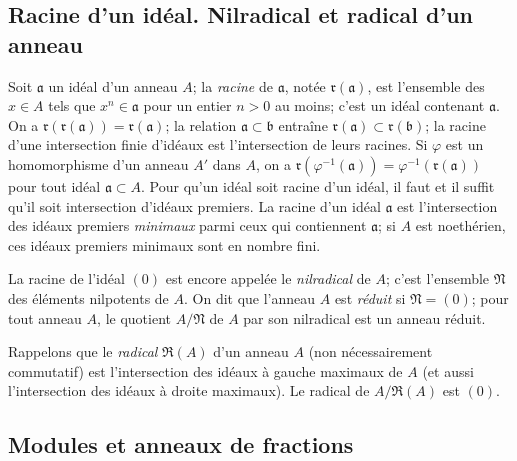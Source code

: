 \subsection{Racine d'un idéal. Nilradical et radical d'un anneau}
\label{subsection:0.1.1-fr}

\begin{env}[1.1.1]
\label{0.1.1.1-fr}
Soit $\mathfrak{a}$ un idéal d'un anneau $A$; la \emph{racine} de $\mathfrak{a}$, notée $\mathfrak{r}(\mathfrak{a})$, est l'ensemble des $x\in A$ tels que $x^n\in\mathfrak{a}$ pour un entier $n>0$ au moins; c'est un idéal contenant $\mathfrak{a}$.
On a $\mathfrak{r}(\mathfrak{r}(\mathfrak{a}))=\mathfrak{r}(\mathfrak{a})$; la relation $\mathfrak{a}\subset\mathfrak{b}$ entraîne $\mathfrak{r}(\mathfrak{a})\subset\mathfrak{r}(\mathfrak{b})$; la racine d'une intersection finie d'idéaux est l'intersection de leurs racines.
Si $\varphi$ est un homomorphisme d'un anneau $A'$ dans $A$, on a $\mathfrak{r}(\varphi^{-1}(\mathfrak{a}))=\varphi^{-1}(\mathfrak{r}(\mathfrak{a}))$ pour tout idéal $\mathfrak{a}\subset A$.
Pour qu'un idéal soit racine d'un idéal, il faut et il suffit qu'il soit intersection d'idéaux premiers.
La racine d'un idéal $\mathfrak{a}$ est l'intersection des idéaux premiers \emph{minimaux} parmi ceux qui contiennent $\mathfrak{a}$; si $A$ est noethérien, ces idéaux premiers minimaux sont en nombre fini.

La racine de l'idéal $(0)$ est encore appelée le \emph{nilradical} de $A$; c'est l'ensemble $\mathfrak{N}$ des éléments nilpotents de $A$.
On dit que l'anneau $A$ est \emph{réduit} si $\mathfrak{N}=(0)$; pour tout anneau $A$, le quotient $A/\mathfrak{N}$ de $A$ par son nilradical est un anneau réduit.
\end{env}

\begin{env}[1.1.2]
\label{0.1.1.2-fr}
Rappelons que le \emph{radical} $\mathfrak{R}(A)$ d'un anneau $A$ (non nécessairement commutatif) est l'intersection des idéaux à gauche maximaux de $A$ (et aussi l'intersection des idéaux à droite maximaux).
Le radical de $A/\mathfrak{R}(A)$ est $(0)$.
\end{env}

\subsection{Modules et anneaux de fractions}
\label{subsection:0.1.2-fr}

